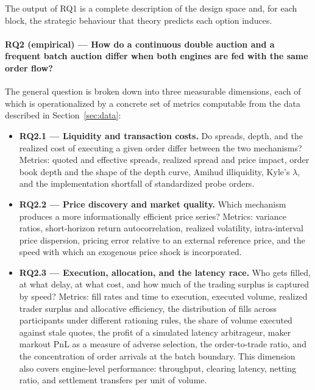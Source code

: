 \documentclass[11pt]{article}
\begin{document}
The output of RQ1 is a complete description of the design space and, for each block, the strategic behaviour that theory predicts each option induces.

\paragraph{RQ2 (empirical) --- How do a continuous double auction and a frequent batch auction differ when both engines are fed with the same order flow?}

The general question is broken down into three measurable dimensions, each of which is operationalized by a concrete set of metrics computable from the data described in Section~\ref{sec:data}:

\begin{itemize}
    \item \textbf{RQ2.1 --- Liquidity and transaction costs.} Do spreads, depth, and the realized cost of executing a given order differ between the two mechanisms? Metrics: quoted and effective spreads, realized spread and price impact, order book depth and the shape of the depth curve, Amihud illiquidity, Kyle's $\lambda$, and the implementation shortfall of standardized probe orders.

    \item \textbf{RQ2.2 --- Price discovery and market quality.} Which mechanism produces a more informationally efficient price series? Metrics: variance ratios, short-horizon return autocorrelation, realized volatility, intra-interval price dispersion, pricing error relative to an external reference price, and the speed with which an exogenous price shock is incorporated.

    \item \textbf{RQ2.3 --- Execution, allocation, and the latency race.} Who gets filled, at what delay, at what cost, and how much of the trading surplus is captured by speed? Metrics: fill rates and time to execution, executed volume, realized trader surplus and allocative efficiency, the distribution of fills across participants under different rationing rules, the share of volume executed against stale quotes, the profit of a simulated latency arbitrageur, maker markout PnL as a measure of adverse selection, the order-to-trade ratio, and the concentration of order arrivals at the batch boundary. This dimension also covers engine-level performance: throughput, clearing latency, netting ratio, and settlement transfers per unit of volume.
\end{itemize}
\end{document}
